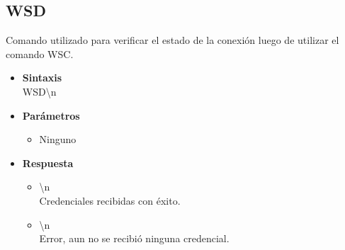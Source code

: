 \documentclass[a4paper,spanish]{article}
\begin{document}
\subsection{WSD}
Comando utilizado para verificar el estado de la conexión luego de utilizar el comando WSC.  
\begin{itemize}
	\item \textbf{Sintaxis}\\
	{\ttfamily WSD\textbackslash n}
	\item \textbf{Parámetros}
	\begin{itemize}
		\item Ninguno 
	\end{itemize}
	\item \textbf{Respuesta}
	\begin{itemize}
		\item{\textbackslash n} \\
		Credenciales recibidas con éxito.
		\item{\textbackslash n} \\
		Error, aun no se recibió ninguna credencial.
	\end{itemize}
\end{itemize}
\end{document}
